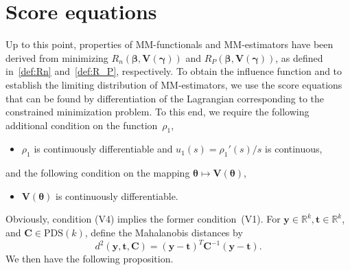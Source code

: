 \documentclass{article}
\numberwithin{equation}{section}
\theoremstyle{plain}
\newcommand{\R}{\mathbb{R}}
\newcommand{\bbeta}{\bm\beta}
\newcommand{\btheta}{\bm\theta}
\newcommand{\bgamma}{\bm\gamma}
\newcommand{\by}{\mathbf{y}}
\newcommand{\bt}{\mathbf{t}}
\newcommand{\bV}{\mathbf{V}}
\newcommand{\bC}{\mathbf{C}}
\begin{document}
\section{Score equations}
\label{sec:equations}
Up to this point, properties of MM-functionals and MM-estimators have been derived from 
minimizing $R_n(\bbeta,\bV(\bgamma))$ and $R_P(\bbeta,\bV(\bgamma))$,
as defined in~\eqref{def:Rn} and~\eqref{def:R_P}, respectively.
To obtain the influence function and to establish the limiting distribution of MM-estimators,
we use the score equations that can be found by differentiation of the Lagrangian corresponding to the
constrained minimization problem.
To this end, we require the following additional condition on the function~$\rho_1$,
\begin{itemize}
\item[(R4)]
$\rho_1$ is continuously differentiable and $u_1(s)=\rho_1'(s)/s$ is continuous,
\end{itemize}
and the following condition on the mapping $\btheta\mapsto\bV(\btheta)$,
\begin{itemize}
\item[(V4)]
$\bV(\btheta)$ is continuously differentiable.
\end{itemize}
Obviously, condition (V4) implies the former condition~(V1).
For 
$\by\in\R^k,\bt\in\R^k$, 
and $\bC\in\text{PDS}(k)$, define the Mahalanobis distances by
\begin{equation}
\label{def:Mahalanobis distance}
d^2(\by,\bt,\bC)=(\by-\bt)^T\bC^{-1}(\by-\bt).
\end{equation}
We then have the following proposition.
\end{document}
